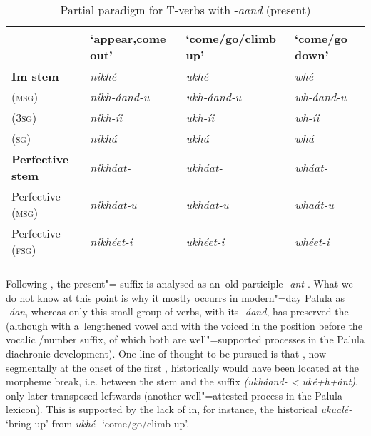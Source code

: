 \begin{table}[ht]
\caption{Partial paradigm for T-verbs with -\textit{aand} (present)}
\begin{tabularx}{\textwidth}{ l Q Q Q }
\lsptoprule
&
`appear,\newline come out' &
`come/go/\newline climb up' &
`come/go down'\\\hline
\textbf{Im stem} &
\textit{nikhé- } &
\textit{ukhé-} &
\textit{whé-} \\
 (\textsc{msg}) &
\textit{nikh-áand-u} &
\textit{ukh-áand-u} &
\textit{wh-áand-u} \\
 (\textsc{3sg}) &
\textit{nikh-íi} &
\textit{ukh-íi} &
\textit{wh-íi} \\
 (\textsc{sg}) &
\textit{nikhá} &
\textit{ukhá} &
\textit{whá} \\
\textbf{Perfective stem} &
\textit{nikháat-} &
\textit{ukháat-} &
\textit{wháat-} \\
Perfective (\textsc{msg}) &
\textit{nikháat-u} &
\textit{ukháat-u} &
\textit{whaát-u} \\
Perfective (\textsc{fsg}) &
\textit{nikhéet-i} &
\textit{ukhéet-i} &
\textit{whéet-i} \\\lspbottomrule
\end{tabularx}
\label{tab:8-10}
\end{table}


Following \citet[22]{morgenstierne1941}, the present"= suffix is analysed as an~old participle \textit{-ant-}. What we do not know at this point is why it mostly occurrs in modern"=day Palula as \textit{-áan}, whereas only this small group of verbs, with its \textit{-áand}, has preserved the  (although with a~lengthened vowel and with the  voiced in the position before the vocalic /number suffix, of which both are well"=supported processes in the Palula diachronic development). One line of thought to be pursued is that , now segmentally at the onset of the first , historically would have been located at the morpheme break, i.e. between the stem and the  suffix \textit{(ukháand- {\textless} uké+h+ánt)}, only later transposed leftwards (another well"=attested process in the Palula lexicon). This is supported by the lack of  in, for instance, the historical  \textit{ukualé-} `bring up' from \textit{ukhé-} `come/go/climb up'.


